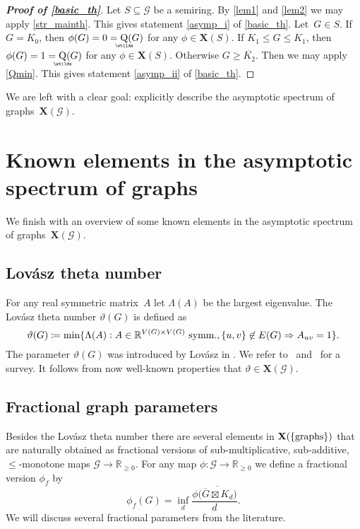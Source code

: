 \documentclass[a4paper, fleqn]{amsart}
\theoremstyle{plain}
\theoremstyle{definition}
\DeclareMathOperator{\asympsubrank}{\underaccent{\wtilde}{Q}}
\newcommand{\RR}{\mathbb{R}}
\newcommand{\jeroen}[1]{#1}
\let\leqx\leqslant
\let\geqx\geqslant
\newcommand{\graphs}{\mathcal{G}}
\newcommand{\aspec}{\mathbf{X}}
\newcommand{\textgraphs}{\{\textnormal{graphs}\}}
\let\leqx\leqslant
\let\geqx\geqslant
\begin{document}
\begin{proof}[\upshape\bfseries Proof of \cref{basic_th}]
Let $S\subseteq \graphs$ be a semiring.
By \cref{lem1} and \cref{lem2} we may apply \cref{str_mainth}. This gives statement \ref{asymp_i} of \cref{basic_th}.
%
Let~$G\in S$.
If $G = K_0$, then $\phi(G) = 0 = \asympsubrank(G)$ for any $\phi \in \aspec(S)$.
If $K_1 \leqx G \leqx K_1$, then~$\phi(G) = 1 = \asympsubrank(G)$ for any $\phi \in \aspec(S)$.
Otherwise %
%
$G \geqx \overline{K_2}$. Then we may apply \cref{Qmin}. This gives statement \ref{asymp_ii} of \cref{basic_th}.
\end{proof}

We are left with a clear goal: explicitly describe the asymptotic spectrum of graphs~$\aspec(\graphs)$.

%
%
%
%
%
%
%
%
%
%
%
%
%
%
%
%
%
%
%
%
%
%
%
%
%
%
%
%
%
%
%
%
%
%
%
%
%
%
%
%
%
%
%
%
%
%
%
%
%
%
%
%
%
%
%
%
%
%
%
%
%
%
%
%
%
%
%
%
%
%
%
%
%
%
%
%
%
%
%
%
%
%
%
%
%
%
%
%
%
%
%
%
%
%
%
%
%
%
%
%
%
%
%
%
%
%
%
%
%
%
%
%
%
%
%
%
%
%
%
%
%
%
%
%
%
%
%
%
%
%
%
%
%
%
%
%
%
%
%
%
%
%
%
%
%
%
%
%
%
%
%
%
%
%
%
%
%
%
%
%
%
%
%
%
%
%
%
%
%
%
%
%
%
%
%
%
%
%
%
%
%
%
%
%
%
%
%
%
%
%
%
%
%
%
%
%
%
%
%
%
%
%
%
%
%
%
%
%
%
%
%
%
%
%
%
%
%
%
%
%
%
%
%
%
%
%
%
%
%
%
%
%
%
%
%
%
%
%
%
%
%
%
%
%
%
%
%
%
%
%
%
%
%
%
%
%
%
%
%
%
%
%

\section{Known elements in the asymptotic spectrum of graphs}

We finish with an overview of some known elements in the asymptotic spectrum of graphs~$\aspec(\graphs)$. 
\subsection{Lovász theta number}
\jeroen{For any real symmetric matrix~$A$ let $\Lambda(A)$ be the largest eigenvalue. 
%
The Lovász theta number $\vartheta(G)$ is defined as
\[
%
\vartheta(G) \coloneqq \min\{ \Lambda(A) : A \in \RR^{V(G)\times V(G)} \textnormal{ symm.}, \{u,v\}\not\in E(G)\Rightarrow A_{uv} = 1\}.
\]}%
The parameter $\vartheta(G)$ was introduced by Lovász in \cite{lovasz1979shannon}. We refer to~\cite{knuth1994sandwich} and~\cite{schrijver2003combinatorial} for a survey.
It follows from now well-known properties that
%
%
$\vartheta \in \aspec(\graphs)$. %
%
%
%
%
%
%
%
%
%
%
%
%
%
%
%
%
%
%
%
%
%
%
%
%

\subsection{Fractional graph parameters}\label{sec:frac}
Besides the Lovász theta number there are several elements in $\aspec(\textgraphs)$ %
that are naturally obtained as fractional versions of sub-multiplicative, sub-additive, $\leqx$-monotone maps $\graphs \to \RR_{\geq 0}$.
For any map $\phi : \graphs \to \RR_{\geq0}$ we define a fractional version $\phi_f$ by
%
%
%
\[
\phi_f(G) = \inf_d \frac{\phi\bigl( \overline{\overline{G} \boxtimes K_d} \bigr)}{d}.
\]
We will discuss several fractional parameters from the literature. %
\end{document}
